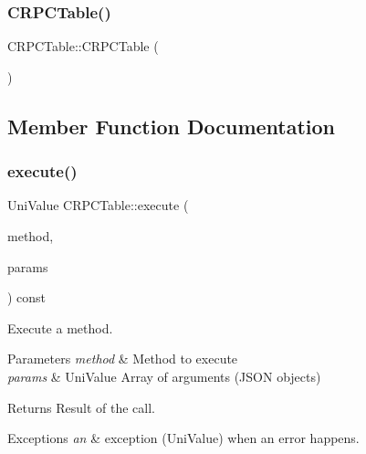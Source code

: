 \subsubsection{\texorpdfstring{C\+R\+P\+C\+Table()}{CRPCTable()}}
{\footnotesize\ttfamily C\+R\+P\+C\+Table\+::\+C\+R\+P\+C\+Table (\begin{DoxyParamCaption}{ }\end{DoxyParamCaption})}



\subsection{Member Function Documentation}
\mbox{\label{class_c_r_p_c_table_a30bfd77e85ecc56b58da3f8582af1ac8}} 
\subsubsection{\texorpdfstring{execute()}{execute()}}
{\footnotesize\ttfamily Uni\+Value C\+R\+P\+C\+Table\+::execute (\begin{DoxyParamCaption}\item[{const std\+::string \&}]{method,  }\item[{const Uni\+Value \&}]{params }\end{DoxyParamCaption}) const}

Execute a method. 
\begin{DoxyParams}{Parameters}
{\em method} & Method to execute \\
\hline
{\em params} & Uni\+Value Array of arguments (J\+S\+ON objects) \\
\hline
\end{DoxyParams}
\begin{DoxyReturn}{Returns}
Result of the call. 
\end{DoxyReturn}

\begin{DoxyExceptions}{Exceptions}
{\em an} & exception (Uni\+Value) when an error happens. \\
\hline
\end{DoxyExceptions}
\mbox{\label{class_c_r_p_c_table_a3d9af8e5975ee8d872b49992faae3ba6}} 
